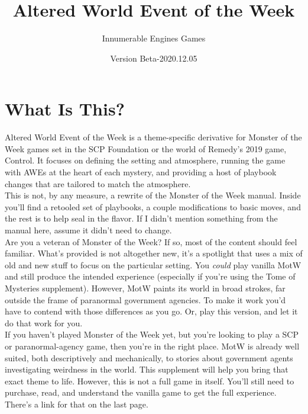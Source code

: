 \documentclass[10pt,oneside,landscape]{memoir}
\begin{document}
\title{Altered World Event of the Week}
\author{Innumerable Engines Games}
\date{Version Beta-2020.12.05}
\maketitle
\pagebreak

\fontsize{12}{14}\selectfont

\chapter*{What Is This?}
\begin{multicols}{2}

Altered World Event of the Week is a theme-specific derivative for Monster of the Week games set in the SCP Foundation or the world of Remedy’s 2019 game, Control.  It focuses on defining the setting and atmosphere, running the game with AWEs at the heart of each mystery, and providing a host of playbook changes that are tailored to match the atmosphere.
\\[4mm]
This is not, by any measure, a rewrite of the Monster of the Week manual.  Inside you'll find a retooled set of playbooks, a couple modifications to basic moves, and the rest is to help seal in the flavor.  If I didn’t mention something from the manual here, assume it didn’t need to change.
\\[4mm]
Are you a veteran of Monster of the Week?  If so, most of the content should feel familiar.  What's provided is not altogether new, it's a spotlight that uses a mix of old and new stuff to focus on the particular setting.  You \textit{could} play vanilla MotW and still produce the intended experience (especially if you’re using the Tome of Mysteries supplement).  However, MotW paints its world in broad strokes, far outside the frame of paranormal government agencies.  To make it work you’d have to contend with those differences as you go.  Or, play this version, and let it do that work for you.
\\[4mm]
If you haven’t played Monster of the Week yet, but you’re looking to play a SCP or paranormal-agency game, then you’re in the right place.  MotW is already well suited, both descriptively and mechanically, to stories about government agents investigating weirdness in the world. This supplement will help you bring that exact theme to life.  However, this is not a full game in itself.  You’ll still need to purchase, read, and understand the vanilla game to get the full experience.  There’s a link for that on the last page.


\end{multicols}
\end{document}
